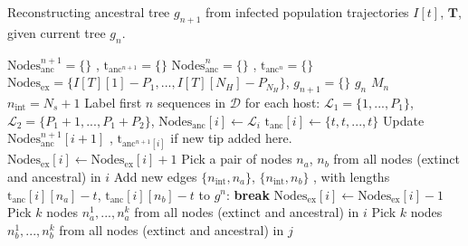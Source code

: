 \documentclass[a4paper,18pt]{report}
\begin{document}
\begin{algorithm}
\caption{Reconstructing ancestral tree $g_{n+1}$ from infected population trajectories $I[t]$, $\mathbf{T}$, given current tree $g_n$. \label{alg:g_from_I_g}}
\begin{algorithmic}
\STATE ${\textrm{Nodes}_{\textrm{anc}}^{n+1}=\{\}}$ , ${\textrm{t}_{\textrm{anc}^{n+1}}=\{\}}$ 
\STATE ${\textrm{Nodes}_{\textrm{anc}}^{n}=\{\}}$ , ${\textrm{t}_{\textrm{anc}^{n}}=\{\}}$ 
\STATE ${\textrm{Nodes}_{\textrm{ex}}}=\{I[T][1] - P_1, ..., I[T][N_H] - P_{N_H}\}$,   
\STATE $g_{n+1}=\{\}$ 
\STATE $g_{n}$ 
\STATE $M_n$ 
\STATE $n_{\textrm{int}}= N_s + 1$ 
\STATE Label first $n$ sequences in $\mathcal{D}$ for each host: $\mathcal{L}_1=\{1,...,P_1\}$,  $\mathcal{L}_2=\{P_1+1,...,P_1 + P_2\}$, 
{
{
	\STATE $\textrm{Nodes}_{\textrm{anc}}[i] \gets \mathcal{L}_i $
	\STATE $\textrm{t}_{\textrm{anc}}[i] \gets \{t, t, ..., t\}$
	\STATE Update ${\textrm{Nodes}_{\textrm{anc}}^{n+1}[i+1]}$ , ${\textrm{t}_{\textrm{anc}^{n+1}[i]}}$ if new tip added here.
}
\ENDIF
{}	
	\STATE $\textrm{Nodes}_{\textrm{ex}}[i] \gets \textrm{Nodes}_{\textrm{ex}}[i]  + 1 $
\ENDIF
{}	
{
	\STATE Pick a pair of nodes $n_a$, $n_b$ from all nodes (extinct and ancestral) in $i$
	{
		\STATE  Add new edges $\{n_{\textrm{int}}, n_a \}$, $\{n_{\textrm{int}}, n_b \}$ , with lengths $\textrm{t}_{\textrm{anc}}[i][n_a] - t$, $\textrm{t}_{\textrm{anc}}[i][n_b] - t$ to $g^n$:
		\STATE \textbf{break}
	}
	\ELSE
	{
		\STATE $\textrm{Nodes}_{\textrm{ex}}[i] \gets \textrm{Nodes}_{\textrm{ex}}[i]  - 1 $
	}
	\ENDIF
}
\ENDIF
{}	
{
	\STATE Pick $k$ nodes $n_a^1,...,n_a^k$ from all nodes (extinct and ancestral) in $i$
	\STATE Pick $k$ nodes $n_b^1,...,n_b^k$ from all nodes (extinct and ancestral) in $j$
}}
\end{algorithmic}
\end{algorithm}
\end{document}

